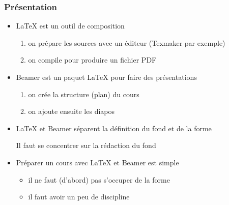 
\begin{frame}
  \frametitle{Présentation}

  \begin{itemize}
  \item \LaTeX{} est un outil de composition
    
    \begin{enumerate}
    \item on prépare les sources avec un éditeur (Texmaker par exemple)
    \item on compile pour produire un fichier PDF
    \end{enumerate}

    \pause
    
  \item Beamer est un paquet \LaTeX{} pour faire des présentations
    
    \begin{enumerate}
    \item on crée la structure (plan) du cours
    \item on ajoute ensuite les diapos
    \end{enumerate}

    \pause

  \item \LaTeX{} et Beamer séparent la définition du fond et de la forme
    \begin{center}
      \begin{alertenv}
        Il faut se concentrer sur la rédaction du fond
      \end{alertenv}
    \end{center}

    \pause

  \item Préparer un cours avec \LaTeX{} et Beamer est simple

    \begin{itemize}
    \item il ne faut (d'abord) pas s'occuper de la forme
    \item il faut avoir un peu de \alert{discipline}
    \end{itemize}
  \end{itemize}
\end{frame}


